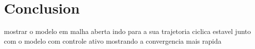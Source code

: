 
\section{Conclusion}

	mostrar o modelo em malha aberta indo para a sua trajetoria ciclica estavel junto com o modelo com controle ativo 
	mostrando a convergencia mais rapida